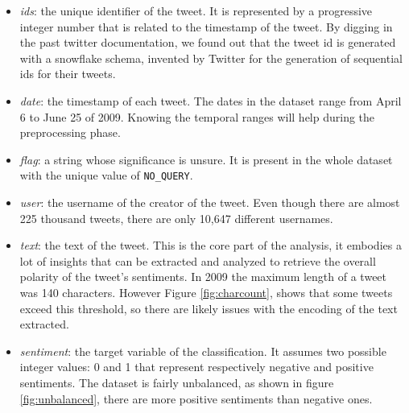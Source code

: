 \documentclass[conference]{IEEEtran}
\begin{document}
\begin{itemize}
    \item \textit{ids}: the unique identifier of the tweet. It is represented by a progressive integer number that is related to the timestamp of the tweet. By digging in the past twitter documentation, we found out that the tweet id is generated with a snowflake schema\cite{snowflake}, invented by Twitter for the generation of sequential ids for their tweets.
        \begin{figure}[h]
        \centering
        
        \label{fig:snowflake}
    \end{figure}
    \item \textit{date}: the timestamp of each tweet. %
    The dates in the dataset range from April 6 to June 25 of 2009. Knowing the temporal ranges will help during the preprocessing phase.
    \item \textit{flag}: a string whose significance is unsure. It is present in the whole dataset with the unique value of \texttt{NO\_QUERY}. %
    \item \textit{user}: the username of the creator of the tweet. Even though there are almost 225 thousand tweets, there are only 10,647 different usernames. %
    \item \textit{text}: the text of the tweet. This is the core part of the analysis, it embodies a lot of insights that can be extracted and analyzed to retrieve the overall polarity of the tweet's sentiments. In 2009 the maximum length of a tweet was 140 characters\cite{tweet_lenght}. However Figure \ref{fig:charcount}, shows that some tweets exceed this threshold, so there are likely issues with the encoding of the text extracted.
    \item \textit{sentiment}: the target variable of the classification. It assumes two possible integer values: 0 and 1 that represent respectively negative and positive sentiments. The dataset is fairly unbalanced, as shown in figure \ref{fig:unbalanced}, there are more positive sentiments than negative ones.
\end{itemize}
\end{document}
